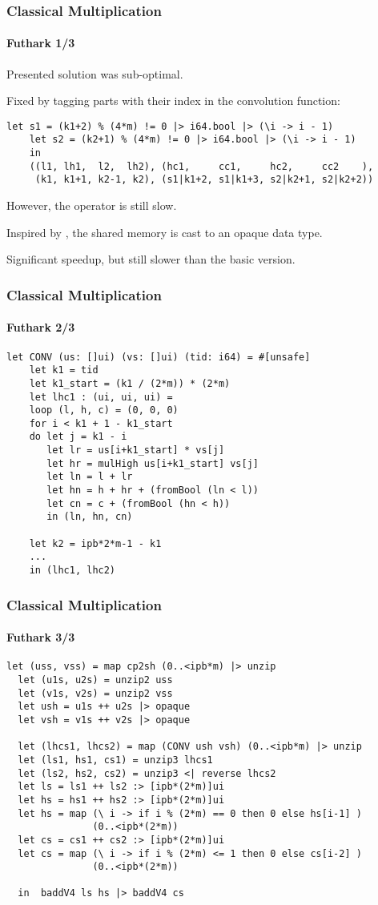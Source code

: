 \begin{frame}[fragile]
  \frametitle{Classical Multiplication}
  \framesubtitle{Futhark 1/3}
  Presented solution was sub-optimal.

  Fixed by tagging parts with their index in the convolution function:

  \begin{lstlisting}[language=futhark,basicstyle=\scriptsize,gobble=4]
    let s1 = (k1+2) % (4*m) != 0 |> i64.bool |> (\i -> i - 1)
    let s2 = (k2+1) % (4*m) != 0 |> i64.bool |> (\i -> i - 1)
    in
    ((l1, lh1,  l2,  lh2), (hc1,     cc1,     hc2,     cc2    ),
     (k1, k1+1, k2-1, k2), (s1|k1+2, s1|k1+3, s2|k2+1, s2|k2+2))
   \end{lstlisting}\pause

   However, the operator is still slow.

   Inspired by \cite{oancea2024gpu}, the shared memory is cast to an opaque data
   type.\pause

   Significant speedup, but still slower than the basic version.
\end{frame}


\begin{frame}[fragile]
  \frametitle{Classical Multiplication}
  \framesubtitle{Futhark 2/3}
  \begin{lstlisting}[language=futhark,basicstyle=\scriptsize,gobble=2]
  let CONV (us: []ui) (vs: []ui) (tid: i64) = #[unsafe]
    let k1 = tid
    let k1_start = (k1 / (2*m)) * (2*m)
    let lhc1 : (ui, ui, ui) =
    loop (l, h, c) = (0, 0, 0)
    for i < k1 + 1 - k1_start
    do let j = k1 - i
       let lr = us[i+k1_start] * vs[j]
       let hr = mulHigh us[i+k1_start] vs[j]
       let ln = l + lr
       let hn = h + hr + (fromBool (ln < l))
       let cn = c + (fromBool (hn < h))
       in (ln, hn, cn)

    let k2 = ipb*2*m-1 - k1
    ...
    in (lhc1, lhc2)
   \end{lstlisting}
\end{frame}


\begin{frame}[fragile]
  \frametitle{Classical Multiplication}
  \framesubtitle{Futhark 3/3}
  \begin{lstlisting}[language=futhark,basicstyle=\scriptsize,gobble=2]
  let (uss, vss) = map cp2sh (0..<ipb*m) |> unzip
  let (u1s, u2s) = unzip2 uss
  let (v1s, v2s) = unzip2 vss
  let ush = u1s ++ u2s |> opaque
  let vsh = v1s ++ v2s |> opaque

  let (lhcs1, lhcs2) = map (CONV ush vsh) (0..<ipb*m) |> unzip
  let (ls1, hs1, cs1) = unzip3 lhcs1
  let (ls2, hs2, cs2) = unzip3 <| reverse lhcs2
  let ls = ls1 ++ ls2 :> [ipb*(2*m)]ui
  let hs = hs1 ++ hs2 :> [ipb*(2*m)]ui
  let hs = map (\ i -> if i % (2*m) == 0 then 0 else hs[i-1] )
               (0..<ipb*(2*m))
  let cs = cs1 ++ cs2 :> [ipb*(2*m)]ui
  let cs = map (\ i -> if i % (2*m) <= 1 then 0 else cs[i-2] )
               (0..<ipb*(2*m))

  in  baddV4 ls hs |> baddV4 cs
   \end{lstlisting}
\end{frame}

